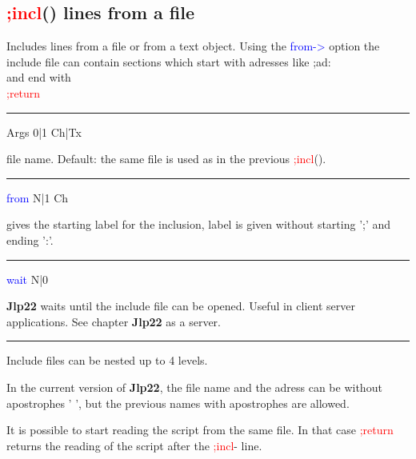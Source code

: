\subsection{\textcolor{Red}{;incl}() lines from a file}
\label{incl}
Includes lines from a file or from a text object. Using the \textcolor{blue}{from->}
option the include file can contain sections which start with adresses like
;ad: \\
and end with \\
\textcolor{Red}{;return}
\vspace{0.3cm}
\hrule
\vspace{0.3cm}
\noindent Args  \tabto{3cm}  0|1  \tabto{5cm}   Ch|Tx  \tabto{7cm}
\begin{changemargin}{3cm}{0cm}
\noindent   file name. Default: the same file is used as in the previous \textcolor{Red}{;incl}().
\end{changemargin}
\vspace{0.3cm}
\hrule
\vspace{0.3cm}
\noindent \textcolor{blue}{from}  \tabto{3cm}  N|1  \tabto{5cm}   Ch  \tabto{7cm}
\begin{changemargin}{3cm}{0cm}
\noindent gives the starting label for the inclusion, label is given without starting ';'
and ending ':'.
\end{changemargin}
\vspace{0.3cm}
\hrule
\vspace{0.3cm}
\noindent \textcolor{blue}{wait} \tabto{3cm}  N|0  \tabto{5cm}    \tabto{7cm}
\begin{changemargin}{3cm}{0cm}
\noindent  \textbf{Jlp22} waits until the include file can be opened. Useful in client server applications.
See chapter \textbf{Jlp22} as a server.
\end {changemargin}
\hrule
\vspace{0.2cm}
\begin{note}
Include files can be nested up to 4 levels.
\end{note}
\begin{note}
In the current version of \textbf{Jlp22}, the file name and the adress can be without apostrophes ' ',
but the previous names with apostrophes are allowed.
\end{note}
\begin{note}
It is possible to start reading the script from the same file. In that case \textcolor{Red}{;return} returns the reading of
the script after the \textcolor{Red}{;incl}- line.
\end{note}
